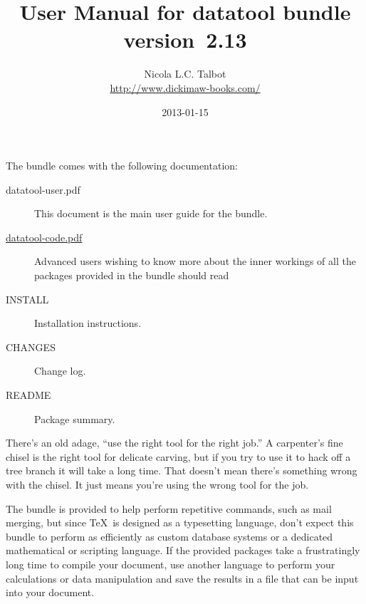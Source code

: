 \documentclass[report,widecs]{nlctdoc}
\begin{document}
\raggedright

\DeleteShortVerb{\|}

 \title{User Manual for datatool bundle version~2.13}
 \author{Nicola L.C. Talbot\\
\url{http://www.dickimaw-books.com/}}

 \date{2013-01-15}
 \maketitle


\noindent
The  bundle comes with the following documentation:
\begin{description}
  \item[datatool-user.pdf]
  This document is the main user guide for the 
  bundle.

  \item[\url{datatool-code.pdf}]
  Advanced users wishing to know more about the inner workings of
  all the packages provided in the  bundle should
  read 

  \item[INSTALL] Installation instructions.

  \item[CHANGES] Change log.

  \item[README] Package summary.
\end{description}

\begin{important}
There's an old adage, ``use the right tool for the right job.''
A carpenter's fine chisel is the right tool for delicate carving,
but if you try to use it to hack off a tree branch it will take a
long time. That doesn't mean there's something wrong with the
chisel. It just means you're using the wrong tool for the job.

The  bundle is provided to help perform repetitive
commands, such as mail merging, but since \TeX\ is designed as a
typesetting language, don't expect this bundle to perform as
efficiently as custom database systems or a dedicated mathematical
or scripting language. If the provided packages take a frustratingly
long time to compile your document, use another language to perform
your calculations or data manipulation and save the results in a
file that can be input into your document.

\end{important}
\end{document}
